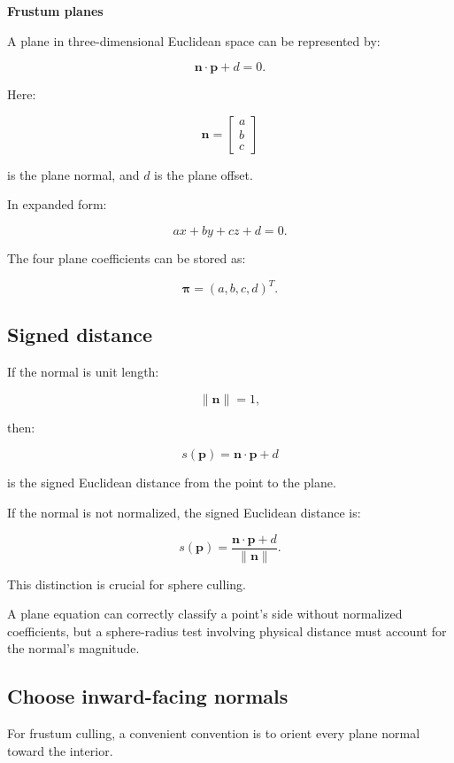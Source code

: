 \textbf{Frustum planes}

A plane in three-dimensional Euclidean space can be represented by:

\[
 \boxed{ \mathbf n\cdot\mathbf p+d=0 }.
\]

Here:

\[
 \mathbf n= \begin{bmatrix}a\\b\\c\end{bmatrix}
\]

is the plane normal, and \(d\) is the plane offset.

In expanded form:

\[
 \boxed{ ax+by+cz+d=0 }.
\]

The four plane coefficients can be stored as:

\[
 \boxed{ \boldsymbol\pi=(a,b,c,d)^T }.
\]

\subsection{Signed distance}\label{02-foundations-ii-ch034-signed-distance}

If the normal is unit length:

\[
 \|\mathbf n\|=1,
\]

then:

\[
 \boxed{ s(\mathbf p)=\mathbf n\cdot\mathbf p+d }
\]

is the signed Euclidean distance from the point to the plane.

If the normal is not normalized, the signed Euclidean distance is:

\[
 \boxed{ s(\mathbf p)= \frac{\mathbf n\cdot\mathbf p+d}{\|\mathbf n\|} }.
\]

This distinction is crucial for sphere culling.

A plane equation can correctly classify a point's side without normalized coefficients, but a sphere-radius test involving physical distance must account for the normal's magnitude.

\subsection{Choose inward-facing normals}\label{02-foundations-ii-ch034-choose-inward-facing-normals}

For frustum culling, a convenient convention is to orient every plane normal toward the interior.

